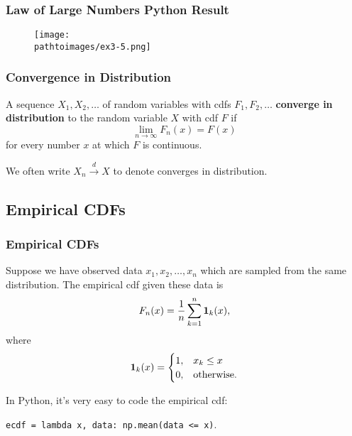 \documentclass{beamer}
\newcommand{\pathtoimages}{/Users/charlesrambo/Desktop/Bootcamp24/Images}
\begin{document}
\begin{frame}
\frametitle{Law of Large Numbers Python Result}
\begin{figure}
\centering
\texttt{[image: \\pathtoimages/ex3-5.png]}
\end{figure}
\end{frame}

\begin{frame}
\frametitle{Convergence in Distribution}
\begin{Definition}
A sequence $X_1, X_2,\ldots$ of random variables with cdfs $F_1, F_2,\ldots$ {\bf converge in distribution} to the random variable $X$ with cdf $F$ if
$$
\lim_{n\to\infty} F_n(x) = F(x)
$$
for every number $x$ at which $F$ is continuous. 
\end{Definition}
We often write $X_n \stackrel{d}{\longrightarrow} X$ to denote converges in distribution.
\end{frame}

\subsection{Empirical CDFs}

\begin{frame}
\frametitle{Empirical CDFs}
\small
\begin{Definition}
Suppose we have observed data $x_1, x_2, \ldots, x_n$ which are sampled from the same distribution. The empirical cdf given these data is
$$
F_n(x) = \frac{1}{n} \sum_{k = 1}^n {\bf 1}_k (x),
$$
where
$$
 {\bf 1}_k(x) = \begin{cases} 1,	&	x _k\leq x\\ 0,&	\text{otherwise.}\end{cases}
$$
\end{Definition}
In Python, it's very easy to code the empirical cdf:
\begin{center} 
\texttt{ecdf = lambda x, data: np.mean(data <= x)}.
\end{center}
\end{frame}
\end{document}
